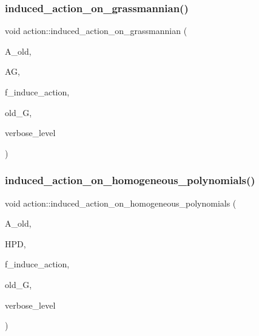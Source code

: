 \mbox{\label{classaction_a295b730ecc0b0bf30f714094fef956ea}} 
\subsubsection{\texorpdfstring{induced\+\_\+action\+\_\+on\+\_\+grassmannian()}{induced\_action\_on\_grassmannian()}\hspace{0.1cm}{\footnotesize\ttfamily [2/2]}}
{\footnotesize\ttfamily void action\+::induced\+\_\+action\+\_\+on\+\_\+grassmannian (\begin{DoxyParamCaption}\item[{\mbox{\hyperlink{classaction}{action}} $\ast$}]{A\+\_\+old,  }\item[{\mbox{\hyperlink{classaction__on__grassmannian}{action\+\_\+on\+\_\+grassmannian}} $\ast$}]{AG,  }\item[{\mbox{\hyperlink{galois_8h_a09fddde158a3a20bd2dcadb609de11dc}{I\+NT}}}]{f\+\_\+induce\+\_\+action,  }\item[{\mbox{\hyperlink{classsims}{sims}} $\ast$}]{old\+\_\+G,  }\item[{\mbox{\hyperlink{galois_8h_a09fddde158a3a20bd2dcadb609de11dc}{I\+NT}}}]{verbose\+\_\+level }\end{DoxyParamCaption})}

\mbox{\label{classaction_acafe8fb1e63926ce35338a292b621f8a}} 
\subsubsection{\texorpdfstring{induced\+\_\+action\+\_\+on\+\_\+homogeneous\+\_\+polynomials()}{induced\_action\_on\_homogeneous\_polynomials()}}
{\footnotesize\ttfamily void action\+::induced\+\_\+action\+\_\+on\+\_\+homogeneous\+\_\+polynomials (\begin{DoxyParamCaption}\item[{\mbox{\hyperlink{classaction}{action}} $\ast$}]{A\+\_\+old,  }\item[{\mbox{\hyperlink{classhomogeneous__polynomial__domain}{homogeneous\+\_\+polynomial\+\_\+domain}} $\ast$}]{H\+PD,  }\item[{\mbox{\hyperlink{galois_8h_a09fddde158a3a20bd2dcadb609de11dc}{I\+NT}}}]{f\+\_\+induce\+\_\+action,  }\item[{\mbox{\hyperlink{classsims}{sims}} $\ast$}]{old\+\_\+G,  }\item[{\mbox{\hyperlink{galois_8h_a09fddde158a3a20bd2dcadb609de11dc}{I\+NT}}}]{verbose\+\_\+level }\end{DoxyParamCaption})}

